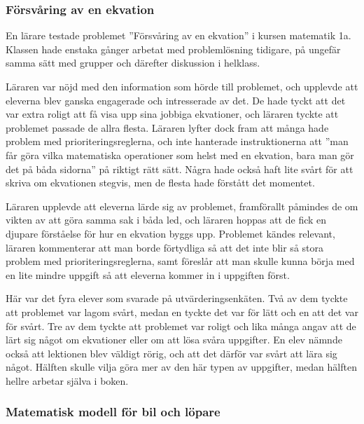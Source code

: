     \subsubsection{Försvåring av en ekvation}
        \label{resultat:ekvation}
        \textcolor{lila}{En lärare testade problemet ''Försvåring av en ekvation'' i kursen matematik 1a. Klassen hade enstaka gånger arbetat med problemlösning tidigare, på ungefär samma sätt med grupper och därefter diskussion i helklass.}
        
        \textcolor{lila}{Läraren var nöjd med den information som hörde till problemet, och upplevde att eleverna blev ganska engagerade och intresserade av det. De hade tyckt att det var extra roligt att få visa upp sina jobbiga ekvationer, och läraren tyckte att problemet passade de allra flesta. Läraren lyfter dock fram att många hade problem med prioriteringsreglerna, och inte hanterade instruktionerna att ''man får göra vilka matematiska operationer som helst med en ekvation, bara man gör det på båda sidorna'' på riktigt rätt sätt. Några hade också haft lite svårt för att skriva om ekvationen stegvis, men de flesta hade förstått det momentet.}
        
        \textcolor{lila}{Läraren upplevde att eleverna lärde sig av problemet, framförallt påmindes de om vikten av att göra samma sak i båda led, och läraren hoppas att de fick en djupare förståelse för hur en ekvation byggs upp. Problemet kändes relevant, läraren kommenterar att man borde förtydliga så att det inte blir så stora problem med prioriteringsreglerna, samt föreslår att man skulle kunna börja med en lite mindre  uppgift så att eleverna kommer in i uppgiften först.}
        
        \textcolor{lila}{Här var det fyra elever som svarade på utvärderingsenkäten. Två av dem tyckte att problemet var lagom svårt, medan en tyckte det var för lätt och en att det var för svårt. Tre av dem tyckte att problemet var roligt och lika många angav att de lärt sig något om ekvationer eller om att lösa svåra uppgifter. En elev nämnde också att lektionen blev väldigt rörig, och att det därför var svårt att lära sig något. Hälften skulle vilja göra mer av den här typen av uppgifter, medan hälften hellre arbetar själva i boken.}

    \subsubsection{Matematisk modell för bil och löpare}
        \label{resultat:Lopare}
    
